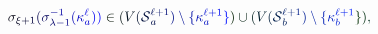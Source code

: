 \documentclass[12pt]{article}
\begin{document}
\makeatletter
\renewcommand*{\@textcolor}[3]{%
  \protect\leavevmode
  \begingroup
    \color#1{#2}#3%
  \endgroup
}
\makeatother
\begin{displaymath}
\mathcolor[RGB]{0,0,15}{\sigma} _ { \mathcolor[RGB]{0,0,30}{\xi} \mathcolor[RGB]{0,0,45}{+} \mathcolor[RGB]{0,0,60}{1} } \mathcolor[RGB]{0,0,75}{(} \mathcolor[RGB]{0,0,90}{\sigma} _ { \mathcolor[RGB]{0,0,105}{\lambda} \mathcolor[RGB]{0,0,120}{-} \mathcolor[RGB]{0,0,135}{1} } ^ { \mathcolor[RGB]{0,0,150}{-} \mathcolor[RGB]{0,0,165}{1} } \mathcolor[RGB]{0,0,180}{(} \mathcolor[RGB]{0,0,195}{\kappa} _ { \mathcolor[RGB]{0,0,210}{a} } ^ { \mathcolor[RGB]{0,0,225}{\ell} } \mathcolor[RGB]{0,0,240}{)} \mathcolor[RGB]{0,0,255}{)} \mathcolor[RGB]{0,15,0}{\in} \mathcolor[RGB]{0,15,15}{(} \mathcolor[RGB]{0,15,30}{V} \mathcolor[RGB]{0,15,45}{(} \mathcal { \mathcolor[RGB]{0,15,60}{S} } _ { \mathcolor[RGB]{0,15,75}{a} } ^ { \mathcolor[RGB]{0,15,90}{\ell} \mathcolor[RGB]{0,15,105}{+} \mathcolor[RGB]{0,15,120}{1} } \mathcolor[RGB]{0,15,135}{)} \mathcolor[RGB]{0,15,150}{\setminus} \mathcolor[RGB]{0,15,165}{\{} \mathcolor[RGB]{0,15,180}{\kappa} _ { \mathcolor[RGB]{0,15,195}{a} } ^ { \mathcolor[RGB]{0,15,210}{\ell} \mathcolor[RGB]{0,15,225}{+} \mathcolor[RGB]{0,15,240}{1} } \mathcolor[RGB]{0,15,255}{\}} \mathcolor[RGB]{0,30,0}{)} \mathcolor[RGB]{0,30,15}{\cup} \mathcolor[RGB]{0,30,30}{(} \mathcolor[RGB]{0,30,45}{V} \mathcolor[RGB]{0,30,60}{(} \mathcal { \mathcolor[RGB]{0,30,75}{S} } _ { \mathcolor[RGB]{0,30,90}{b} } ^ { \mathcolor[RGB]{0,30,105}{\ell} \mathcolor[RGB]{0,30,120}{+} \mathcolor[RGB]{0,30,135}{1} } \mathcolor[RGB]{0,30,150}{)} \mathcolor[RGB]{0,30,165}{\setminus} \mathcolor[RGB]{0,30,180}{\{} \mathcolor[RGB]{0,30,195}{\kappa} _ { \mathcolor[RGB]{0,30,210}{b} } ^ { \mathcolor[RGB]{0,30,225}{\ell} \mathcolor[RGB]{0,30,240}{+} \mathcolor[RGB]{0,30,255}{1} } \mathcolor[RGB]{0,45,0}{\}} \mathcolor[RGB]{0,45,15}{)} \mathcolor[RGB]{0,45,30}{,}
\end{displaymath}
\end{document}
